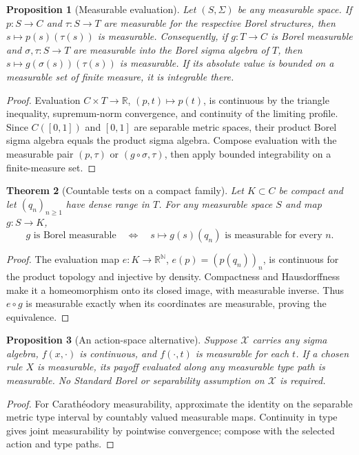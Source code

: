 \documentclass[11pt]{article}
\newtheorem{theorem}{Theorem}
\newtheorem{proposition}[theorem]{Proposition}
\theoremstyle{remark}\newtheorem{remark}[theorem]{Remark}
\newcommand{\R}{\mathbb R}
\newcommand{\X}{\mathcal X}
\begin{document}
\begin{proposition}[Measurable evaluation]\label{prop:measeval}
Let $(S,\Sigma)$ be any measurable space. If $p:S\to C$ and $\tau:S\to T$ are measurable for the respective Borel structures, then $s\mapsto p(s)(\tau(s))$ is measurable. Consequently, if $g:T\to C$ is Borel measurable and $\sigma,\tau:S\to T$ are measurable into the Borel sigma algebra of $T$, then $s\mapsto g(\sigma(s))(\tau(s))$ is measurable. If its absolute value is bounded on a measurable set of finite measure, it is integrable there.
\end{proposition}
\begin{proof}
Evaluation $C\times T\to\R$, $(p,t)\mapsto p(t)$, is continuous by the triangle inequality, supremum-norm convergence, and continuity of the limiting profile. Since $C([0,1])$ and $[0,1]$ are separable metric spaces, their product Borel sigma algebra equals the product sigma algebra. Compose evaluation with the measurable pair $(p,\tau)$ or $(g\circ\sigma,\tau)$, then apply bounded integrability on a finite-measure set.
\end{proof}

\begin{theorem}[Countable tests on a compact family]\label{thm:tests}
Let $K\subset C$ be compact and let $(q_n)_{n\ge1}$ have dense range in $T$. For any measurable space $S$ and map $g:S\to K$,
\[
 g\text{ is Borel measurable}\quad\Longleftrightarrow\quad
 s\mapsto g(s)(q_n)\text{ is measurable for every }n.
\]
\end{theorem}
\begin{proof}
The evaluation map $e:K\to\R^{\mathbb N}$, $e(p)=(p(q_n))_n$, is continuous for the product topology and injective by density. Compactness and Hausdorffness make it a homeomorphism onto its closed image, with measurable inverse. Thus $e\circ g$ is measurable exactly when its coordinates are measurable, proving the equivalence.
\end{proof}

\begin{proposition}[An action-space alternative]\label{prop:caratheodory}
Suppose $\X$ carries any sigma algebra, $f(x,\cdot)$ is continuous, and $f(\cdot,t)$ is measurable for each $t$. If a chosen rule $X$ is measurable, its payoff evaluated along any measurable type path is measurable. No Standard Borel or separability assumption on $\X$ is required.
\end{proposition}
\begin{proof}
For Carath\'eodory measurability, approximate the identity on the separable metric type interval by countably valued measurable maps. Continuity in type gives joint measurability by pointwise convergence; compose with the selected action and type paths.
\end{proof}
\end{document}

